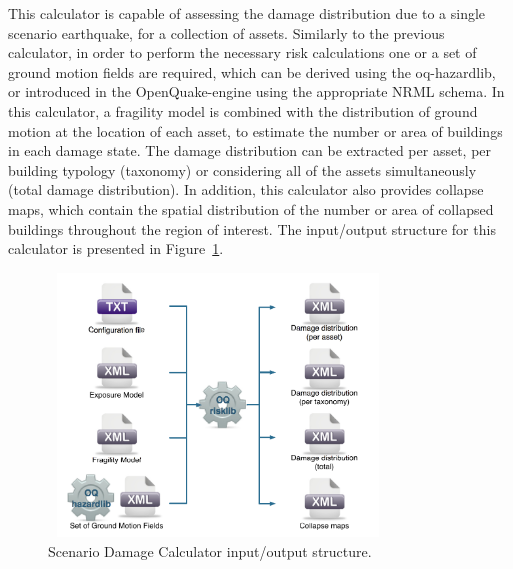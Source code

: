 This calculator is capable of assessing the damage distribution due to a single scenario earthquake, for a collection of assets. Similarly to the previous calculator, in order to perform the necessary risk calculations one or a set of ground motion fields are required, which can be derived using the oq-hazardlib, or introduced in the OpenQuake-engine using the appropriate NRML schema.
In this calculator, a fragility model is combined with the distribution of ground motion at the location of each asset, to estimate the number or area of buildings in each damage state. The damage distribution can be extracted per asset, per building typology (taxonomy) or considering all of the assets simultaneously (total damage distribution). In addition, this calculator also provides collapse maps, which contain the spatial distribution of the number or area of collapsed buildings throughout the region of interest. The input/output structure for this calculator is presented in Figure~\ref{fig:ScnDamage}.

\begin{figure}[ht]
\centering
\includegraphics[width=9cm,height=7cm]{figures/risk/ScenarioDamage.pdf}
\caption{Scenario Damage Calculator input/output structure.}
\label{fig:ScnDamage}
\end{figure}